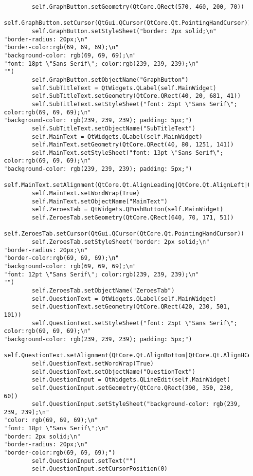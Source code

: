\documentclass{article}
\begin{document}
\begin{lstlisting}
        self.GraphButton.setGeometry(QtCore.QRect(570, 460, 200, 70))
        self.GraphButton.setCursor(QtGui.QCursor(QtCore.Qt.PointingHandCursor))
        self.GraphButton.setStyleSheet("border: 2px solid;\n"
"border-radius: 20px;\n"
"border-color:rgb(69, 69, 69);\n"
"background-color: rgb(69, 69, 69);\n"
"font: 18pt \"Sans Serif\"; color:rgb(239, 239, 239);\n"
"")
        self.GraphButton.setObjectName("GraphButton")
        self.SubTitleText = QtWidgets.QLabel(self.MainWidget)
        self.SubTitleText.setGeometry(QtCore.QRect(40, 20, 681, 41))
        self.SubTitleText.setStyleSheet("font: 25pt \"Sans Serif\"; color:rgb(69, 69, 69);\n"
"background-color: rgb(239, 239, 239); padding: 5px;")
        self.SubTitleText.setObjectName("SubTitleText")
        self.MainText = QtWidgets.QLabel(self.MainWidget)
        self.MainText.setGeometry(QtCore.QRect(40, 80, 1251, 141))
        self.MainText.setStyleSheet("font: 13pt \"Sans Serif\"; color:rgb(69, 69, 69);\n"
"background-color: rgb(239, 239, 239); padding: 5px;")
        self.MainText.setAlignment(QtCore.Qt.AlignLeading|QtCore.Qt.AlignLeft|QtCore.Qt.AlignTop)
        self.MainText.setWordWrap(True)
        self.MainText.setObjectName("MainText")
        self.ZeroesTab = QtWidgets.QPushButton(self.MainWidget)
        self.ZeroesTab.setGeometry(QtCore.QRect(640, 70, 171, 51))
        self.ZeroesTab.setCursor(QtGui.QCursor(QtCore.Qt.PointingHandCursor))
        self.ZeroesTab.setStyleSheet("border: 2px solid;\n"
"border-radius: 20px;\n"
"border-color:rgb(69, 69, 69);\n"
"background-color: rgb(69, 69, 69);\n"
"font: 12pt \"Sans Serif\"; color:rgb(239, 239, 239);\n"
"")
        self.ZeroesTab.setObjectName("ZeroesTab")
        self.QuestionText = QtWidgets.QLabel(self.MainWidget)
        self.QuestionText.setGeometry(QtCore.QRect(420, 230, 501, 101))
        self.QuestionText.setStyleSheet("font: 25pt \"Sans Serif\"; color:rgb(69, 69, 69);\n"
"background-color: rgb(239, 239, 239); padding: 5px;")
        self.QuestionText.setAlignment(QtCore.Qt.AlignBottom|QtCore.Qt.AlignHCenter)
        self.QuestionText.setWordWrap(True)
        self.QuestionText.setObjectName("QuestionText")
        self.QuestionInput = QtWidgets.QLineEdit(self.MainWidget)
        self.QuestionInput.setGeometry(QtCore.QRect(390, 350, 230, 60))
        self.QuestionInput.setStyleSheet("background-color: rgb(239, 239, 239);\n"
"color: rgb(69, 69, 69);\n"
"font: 18pt \"Sans Serif\";\n"
"border: 2px solid;\n"
"border-radius: 20px;\n"
"border-color:rgb(69, 69, 69);")
        self.QuestionInput.setText("")
        self.QuestionInput.setCursorPosition(0)

\end{lstlisting}
\end{document}
